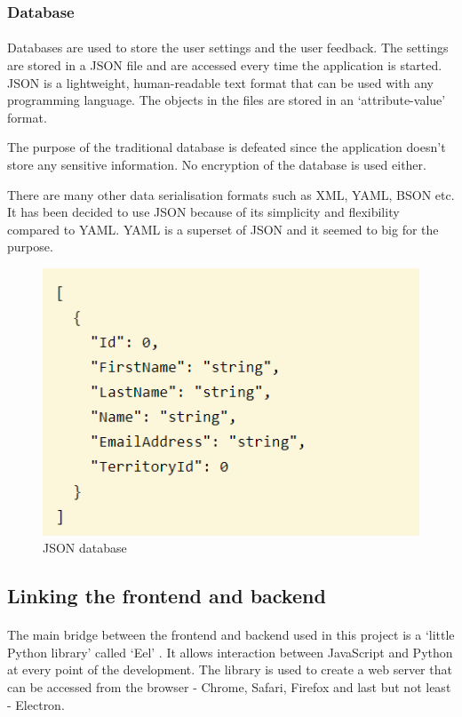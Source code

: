 \documentclass[12pt]{report}
\begin{document}
\subsubsection*{Database}
\paragraph{}
Databases are used to store the user settings and the user feedback. The settings are stored in a JSON file and are
accessed every time the application is started. JSON is a lightweight, human-readable text format that can be used with
any programming language. The objects in the files are stored in an `attribute-value' format. 

The purpose of the traditional database is defeated since the application doesn't store any sensitive information.
No encryption of the database is used either.

There are many other data serialisation formats such as XML, YAML, BSON etc. It has been decided to use JSON because
of its simplicity and flexibility compared to YAML. YAML is a superset of JSON and it seemed to big for the purpose.

\begin{figure}[ht]
  \centering
  \includegraphics[width=0.5\linewidth]{img/json_example.png}
  \caption{JSON database}
  \label{fig:json}
\end{figure}

\clearpage

\subsection*{Linking the frontend and backend}
\paragraph{}
The main bridge between the frontend and backend used in this project is a `little Python library' 
called `Eel' \citep{knott_2022_eel}. It allows interaction between JavaScript and Python at every point of
the development. The library is used to create a web server that can be accessed from the browser - 
Chrome, Safari, Firefox and last but not least - Electron. 
\end{document}

